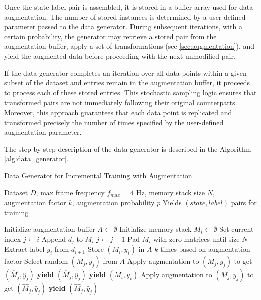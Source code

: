 Once the state-label pair is assembled, it is stored in a buffer array used for data augmentation. The number of stored instances is determined by a user-defined parameter passed to the data generator. During subsequent iterations, with a certain probability, the generator may retrieve a stored pair from the augmentation buffer, apply a set of transformations (see \autoref{sec:augmentation}), and yield the augmented data before proceeding with the next unmodified pair.

If the data generator completes an iteration over all data points within a given subset of the dataset and entries remain in the augmentation buffer, it proceeds to process each of these stored entries. This stochastic sampling logic ensures that transformed pairs are not immediately following their original counterparts. Moreover, this approach guarantees that each data point is replicated and transformed precisely the number of times specified by the user-defined augmentation parameter.

The step-by-step description of the data generator is described in the Algorithm \ref{alg:data_generator}.

\begin{algorithm}[H]
  \caption{Data Generator for Incremental Training with Augmentation}
  \begin{algorithmic}[1]
    \Require Dataset $D$, max frame frequency $f_{max} = 4$ Hz, memory stack size $N$, augmentation factor $k$, augmentation probability $p$
    \Ensure Yields $(state, label)$ pairs for training

    \State Initialize augmentation buffer $A \gets \emptyset$
    \State Initialize memory stack $M_i \gets \emptyset$
    \State Set current index $j \gets i$
    \State Append $d_j$ to $M_i$
    \EndIf
    \State $j \gets j - 1$
    \EndWhile
    \State Pad $M_i$ with zero-matrices until size $N$
    \EndIf
    \State Extract label $y_i$ from $d_{i+1}$
    \State Store $(M_i, y_i)$ in $A$ $k$ times based on augmentation factor
    \State Select random $(M_j, y_j)$ from $A$
    \State Apply augmentation to $(M_j, y_j)$ to get $(\hat{M}_j, \hat{y}_j)$
    \State \textbf{yield} $(\hat{M}_j, \hat{y}_j)$
    \EndIf
    \State \textbf{yield} $(M_i, y_i)$
    \EndFor
    \State Apply augmentation to $(M_j, y_j)$ to get $(\hat{M}_j, \hat{y}_j)$
    \State \textbf{yield} $(\hat{M}_j, \hat{y}_j)$
    \EndFor
    \EndIf
  \end{algorithmic}
  \label{alg:data_generator}
\end{algorithm}

